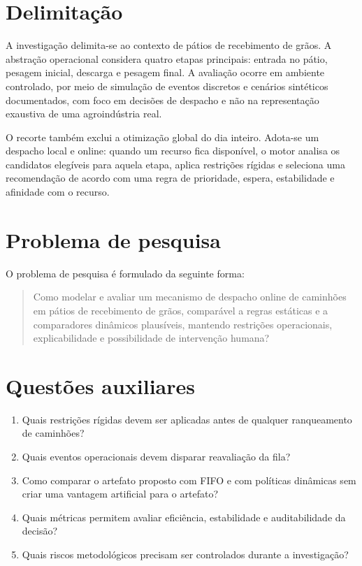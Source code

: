 \documentclass[
  12pt,
  oneside,
  a4paper,
  sumario=tradicional,
  brazil
]{abntex2}
\begin{document}
\section{Delimita\c{c}\~ao}
A investiga\c{c}\~ao delimita-se ao contexto de p\'atios de recebimento de gr\~aos. A abstra\c{c}\~ao operacional considera quatro etapas principais: entrada no p\'atio, pesagem inicial, descarga e pesagem final. A avalia\c{c}\~ao ocorre em ambiente controlado, por meio de simula\c{c}\~ao de eventos discretos e cen\'arios sint\'eticos documentados, com foco em decis\~oes de despacho e n\~ao na representa\c{c}\~ao exaustiva de uma agroind\'ustria real.

O recorte tamb\'em exclui a otimiza\c{c}\~ao global do dia inteiro. Adota-se um despacho local e online: quando um recurso fica dispon\'ivel, o motor analisa os candidatos eleg\'iveis para aquela etapa, aplica restri\c{c}\~oes r\'igidas e seleciona uma recomenda\c{c}\~ao de acordo com uma regra de prioridade, espera, estabilidade e afinidade com o recurso.

\section{Problema de pesquisa}
O problema de pesquisa \'e formulado da seguinte forma:

\begin{quote}
Como modelar e avaliar um mecanismo de despacho online de caminh\~oes em p\'atios de recebimento de gr\~aos, compar\'avel a regras est\'aticas e a comparadores din\^amicos plaus\'iveis, mantendo restri\c{c}\~oes operacionais, explicabilidade e possibilidade de interven\c{c}\~ao humana?
\end{quote}

\section{Quest\~oes auxiliares}
\begin{enumerate}[leftmargin=1.27cm,itemsep=0pt,topsep=0pt,parsep=0pt,partopsep=0pt]
  \item Quais restri\c{c}\~oes r\'igidas devem ser aplicadas antes de qualquer ranqueamento de caminh\~oes?
  \item Quais eventos operacionais devem disparar reavalia\c{c}\~ao da fila?
  \item Como comparar o artefato proposto com FIFO e com pol\'iticas din\^amicas sem criar uma vantagem artificial para o artefato?
  \item Quais m\'etricas permitem avaliar efici\^encia, estabilidade e auditabilidade da decis\~ao?
  \item Quais riscos metodol\'ogicos precisam ser controlados durante a investiga\c{c}\~ao?
\end{enumerate}
\end{document}

